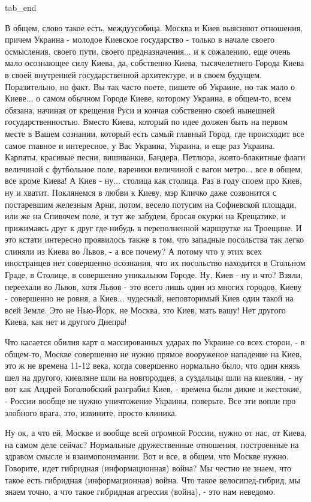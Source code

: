   tab_end
\fi

В общем, слово такое есть, междуусобица.  Москва и Киев выясняют отношения,
причем Украина - молодое Киевское государство - только в начале своего
осмысления, своего пути, своего предназначения... и к сожалению, еще очень мало
осознающее силу Киева, да, собственно Киева, тысячелетнего Города Киева в своей
внутренней государственной архитектуре, и в своем будущем. Поразительно, но
факт. Вы так часто поете, пишете об Украине, но так мало о Киеве... о самом
обычном Городе Киеве, которому Украина, в общем-то, всем обязана, начиная от
крещения Руси и кончая собственно своей нынешней государственностью. Вместо
Киева, который по идее должен быть на первом месте в Вашем сознании, который
есть самый главный Город, где происходит все самое главное и интересное, у Вас
Украина, Украина, и еще раз Украина. Карпаты, красивые песни, вишиванки,
Бандера, Петлюра, жовто-блакитные флаги величиной с футбольное поле, вареники
величиной с вагон метро... все в общем, все кроме Киева!  А Киев - ну...
столица как столица. Раз в году споем про Киев, ну и хватит. Поклянемся в любви
к Киеву, мэр Кличко даже созвонится с постаревшим железным Арни, потом, весело
потусим на Софиевской площади, или же на Спивочем поле, и тут же забудем,
бросая окурки на Крещатике, и прижимаясь друг к друг где-нибудь в переполненной
маршрутке на Троещине. И это кстати интересно проявилось также в том, что
западные посольства так легко слиняли из Киева во Львов, -  а все почему? А
потому что у этих всех иностранцев нет совершенно осознания, что их посольство
находится в Стольном Граде, в Столице, в совершенно уникальном Городе. Ну, Киев
- ну и что?  Взяли, переехали во Львов, хотя Львов - это всего лишь один из
многих городов, Киеву - совершенно не ровня, а Киев... чудесный, неповторимый
Киев один такой на всей Земле. Это не Нью-Йорк, не Москва, это Киев, мать вашу!
Нет другого Киева, как нет и другого Днепра!

Что касается обилия карт о массированных ударах по Украине со всех сторон, -  в
общем-то, Москве совершенно не нужно прямое вооруженое нападение на Киев, это ж
не времена 11-12 века, когда совершенно нормально было, что один князь шел на
другого, киевляне шли на новгородцев, а суздальцы шли на киевлян, - ну вот как
Андрей Боголюбский разграбил Киев, - времена были дикие и жестокие, - России
вообще не нужно уничтожение Украины, поверьте. Все эти вопли про злобного
врага, это, извините, просто клиника. 

Ну ок, а что ей, Москве и вообще всей огромной России, нужно от нас, от Киева,
на самом деле сейчас?  Нормальные дружественные отношения, построенные на
здравом смысле и взаимопонимании. Вот и все, в общем, что Москве нужно.
Говорите, идет гибридная (информационная) война? Мы честно не знаем, что такое
есть гибридная (информационная) война. Что такое велосипед-гибрид, мы знаем
точно, а что такое гибридная агрессия (война), - это нам неведомо. 

